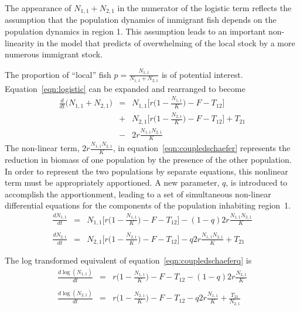 \documentclass[12pt,letterpaper,twoside]{article}
\newcommand\None{{N_{1,1}}}
\newcommand\Ntwo{{N_{2,1}}}
\newcommand\Nsum{{N_{1,1}+N_{2,1}}}
\begin{document}
The appearance of
$\Nsum$ in the numerator of the logistic term reflects the assumption
that the population dynamics of immigrant fish depends on
the population dynamics in region 1. This assumption leads to an
important non-linearity in the model that predicts of
overwhelming of the local stock by a more numerous immigrant stock.

The proportion of ``local'' fish $p = \frac{\None}{\Nsum}$ is of potential interest.
Equation~\ref{eqn:logistic} can be expanded and rearranged to become
\begin{eqnarray}
\label{eqn:coupledschaefer}
\frac{d}{dt}\big(\Nsum\big) &=&\None\Big[r\Big(1-\frac{\None}{K}\Big)
-F - T_{12}\Big] \nonumber\\
&+&\Ntwo\Big[r\Big(1-\frac{\Ntwo}{K}\Big)
-F - T_{12}\Big]  + T_{21}\\
&-& 2r\frac{\None\Ntwo}{K}\nonumber
\end{eqnarray}
The non-linear term, $2r\frac{\None\Ntwo}{K}$, in
equation~\ref{eqn:coupledschaefer} represents the reduction in biomass
of one population by the presence of the other population.
In order to represent
the two populations by separate equations, this
nonlinear term must be appropriately apportioned.
A new parameter, $q$, is introduced to accomplish the apportionment,
leading to a set of simultaneous non-linear differential equations for
the components of the population inhabiting region~1.
\begin{eqnarray}
\frac{d\None}{dt}&=&\None\Big[r\Big(1-\frac{\None}{K}\Big)
-F - T_{12}\Big] - (1-q)2r\frac{\None\Ntwo}{K}\nonumber\\
\\
\frac{d\Ntwo}{dt}&=&\Ntwo\Big[r\Big(1-\frac{\Ntwo}{K}\Big)
-F - T_{12}\Big] - q2r\frac{\None\Ntwo}{K} + T_{21}\nonumber
\end{eqnarray}

The log transformed equivalent of equation~\ref{eqn:coupledschaeferq} is
\begin{eqnarray}
\label{eqn:coupledlogschaefer}
\frac{d\log(\None)}{dt}&=&r\Big(1-\frac{\None}{K}\Big) -F - T_{12} -
(1-q)2r\frac{\Ntwo}{K}\nonumber\\
\\
\frac{d\log(\Ntwo)}{dt}&=&r\Big(1-\frac{\Ntwo}{K}\Big) -F - T_{12} -
q2r\frac{\None}{K} + \frac{T_{21}}{\Ntwo}\nonumber
\end{eqnarray}
\end{document}

